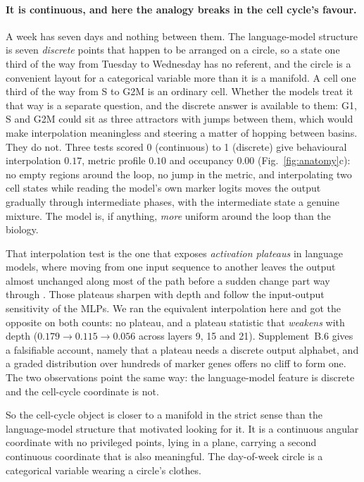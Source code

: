 \documentclass[11pt]{article}
\begin{document}
\paragraph{It is continuous, and here the analogy breaks in the cell cycle's favour.} A week has seven
days and nothing between them. The language-model structure is seven \emph{discrete} points that happen
to be arranged on a circle, so a state one third of the way from Tuesday to Wednesday has no referent,
and the circle is a convenient layout for a categorical variable more than it is a manifold. A cell
one third of the way from S to G2M is an ordinary cell. Whether the models treat it that way is a
separate question, and the discrete answer is available to them: G1, S and G2M could sit as three
attractors with jumps between them, which would make interpolation meaningless and steering a matter
of hopping between basins. They do not. Three tests scored 0 (continuous) to 1 (discrete) give
behavioural interpolation $0.17$, metric profile $0.10$ and occupancy $0.00$
(Fig.~\ref{fig:anatomy}c): no empty regions around the loop, no jump in the metric, and interpolating
two cell states while reading the model's own marker logits moves the output gradually through
intermediate phases, with the intermediate state a genuine mixture. The model is, if anything,
\emph{more} uniform around the loop than the biology.

That interpolation test is the one that exposes \emph{activation plateaus} in language models, where
moving from one input sequence to another leaves the output almost unchanged along most of the path
before a sudden change part way through \citep{shinkle2025plateaus}. Those plateaus sharpen with depth
and follow the input-output sensitivity of the MLPs. We ran the equivalent interpolation here and got
the opposite on both counts: no plateau, and a plateau statistic that \emph{weakens} with depth
($0.179 \to 0.115 \to 0.056$ across layers 9, 15 and 21). Supplement~B.6 gives a falsifiable account,
namely that a plateau needs a discrete output alphabet, and a graded distribution over hundreds of
marker genes offers no cliff to form one. The two observations point the same way: the language-model
feature is discrete and the cell-cycle coordinate is not.

So the cell-cycle object is closer to a manifold in the strict sense than the language-model structure
that motivated looking for it. It is a continuous angular coordinate with no privileged points, lying
in a plane, carrying a second continuous coordinate that is also meaningful. The day-of-week circle is
a categorical variable wearing a circle's clothes.
\end{document}
